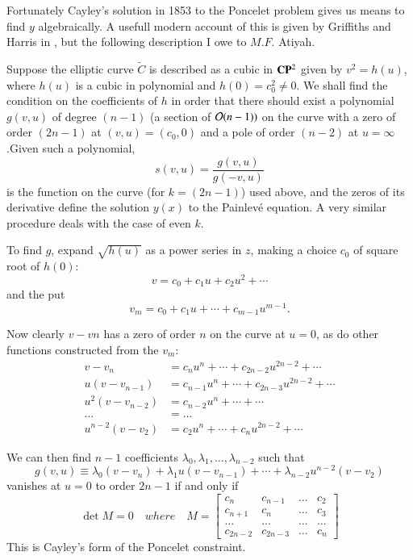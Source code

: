 Fortunately Cayley's solution in 1853 to the Poncelet problem gives us means to find $y$ algebraically. A usefull modern account of this is given by Griffiths and Harris in \cite{art7-key5}, but the following description I owe to $M. F.$ Atiyah.

Suppose the elliptic curve $\tilde{C}$ is described as a cubic in $\mathbf{C}\mathbf{P}^{2}$ given by $v^{2}=h(u)$, where $h(u)$ is a cubic in polynomial and $h(0)= c_{0}^{2} \neq 0$. We shall find the condition on the coefficients of $h$ in order that there should exist a polynomial $g(v,u)$ of degree $(n-1)$ (a section of $\mathcal{O}(n-1))$ on the curve with a zero of order $(2n-1)$ at $(v,u)=(c_{0},0)$ and a pole of order $(n-2)$ at $u=\infty$.\pageoriginale Given such a polynomial,
$$
s(v,u)= \dfrac{g(v,u)}{g(-v,u)}
$$
is the function on the curve (for $k=(2n-1)$) used above, and the zeros of its derivative define the solution $y(x)$ to the Painlev\'e equation. A very similar procedure deals with the case of even $k$.

 To find $g$, expand $\sqrt{h(u)}$ as a power series in $z$, making a choice $c_{0}$ of square root of $h(0)$:
 $$
 v = c_{0}+c_{1}u+c_{2}u^{2}+ \cdots
 $$
 and the put
 $$
 v_{m}=c_{0}+c_{1}u+\cdots + c_{m-1}u^{m-1}.
 $$

 Now clearly $v-v{n}$ has a zero of order $n$ on the curve at $u=0$, as do other functions constructed from the $v_{m}$:
\begin{align*}
v-v_{n} &= c_{n}u^{n}+\cdots +c_{2n-2}u^{2n-2} + \cdots\\
u(v-v_{n-1}) &= c_{n-1}u^{n}+ \cdots + c_{2n-3}u^{2n-2}+ \cdots\\
u^{2}(v-v_{n-2}) &= c_{n-2}u^{n}+ \cdots + \cdots\\
\ldots \quad &= \ldots\\
u^{n-2}(v-v_{2}) &= c_{2}u^{n}+ \cdots + c_{n}u^{2n-2}+\cdots
\end{align*}

We can then find $n-1$ coefficients $\lambda_{0}, \lambda_{1},\ldots,\lambda_{n-2}$ such that 
$$
g(v,u) \equiv \lambda_{0}(v-v_{n}) + \lambda_{1}u(v-v_{n-1})+ \cdots+ \lambda_{n-2}u^{n-2}(v-v_{2})
$$
vanishes at $u=0$ to order $2n-1$ if and only if
\begin{equation*}\label{art7-eq-17}
\det M=0 \quad where \quad M =
\begin{bmatrix}
c_{n} & c_{n-1} &\ldots &c_{2}\\
c_{n+1} & c_{n} &\ldots & c_{3}\\
\ldots & \ldots & \ldots & \ldots\\
c_{2n-2} & c_{2n-3} & \ldots & c_{n}
\end{bmatrix}\tag{17}
\end{equation*}
This is Cayley's form of the Poncelet constraint.

